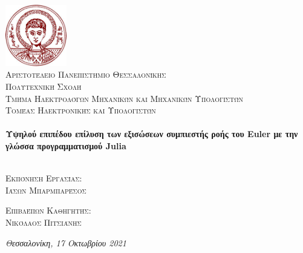 \thispagestyle{empty}
\begin{center}

\includegraphics[width=0.2\textwidth]{figures/ap8.jpeg}~\\[1cm]

\textsc{\LARGE Αριστοτέλειο Πανεπιστήμιο Θεσσαλονίκης}\\[1cm]
\textsc{ Πολυτεχνική Σχολή}\\
\textsc{ Τμήμα Ηλεκτρολόγων Μηχανικών και Μηχανικών Υπολογιστών}\\
\textsc{Τομέας Ηλεκτρονικής και Υπολογιστών}\\[1.5cm]

\HRule \\[0.4cm]
{ \huge \bfseries Υψηλού επιπέδου επίλυση των εξισώσεων συμπιεστής ροής του Euler με την γλώσσα προγραμματισμού Julia\\[0.4cm] }
\HRule \\[2.5cm]

\begin{minipage}[t]{0.48\textwidth}
\textsc{Εκπόνηση Εργασίας:}\\[0.3cm]
\textsc{\Large Ιάσων Μπαρμπαρέσος}
\end{minipage}
\hfill
\begin{minipage}[t]{0.48\textwidth}
\begin{flushright}
\textsc{Επιβλέπων Καθηγητής:}\\[0.3cm]
\textsc{\Large Νικόλαος Πιτσιάνης}
\end{flushright}
\end{minipage}


\vfill

{\Large \textit{Θεσσαλονίκη, 17 Οκτωβρίου 2021}}

\end{center}
\clearpage
 
